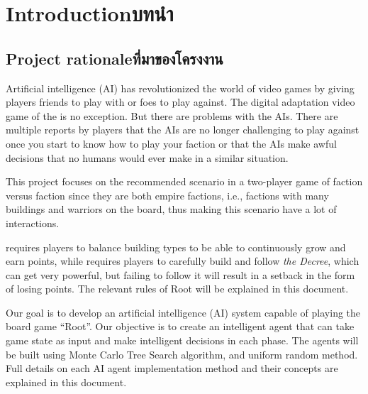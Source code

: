 \chapter{\ifenglish Introduction\else บทนำ\fi}

\section{\ifenglish Project rationale\else ที่มาของโครงงาน\fi}
Artificial intelligence (AI) has revolutionized the world of video games by giving players friends to play with or foes to play against. The digital adaptation video game of the \RootB{} is no exception. But there are problems with the AIs. There are multiple reports by \RootV{} players that the AIs are no longer challenging to play against once you start to know how to play your faction or that the AIs make awful decisions that no humans would ever make in a similar situation.

This project focuses on the recommended scenario in a two-player game of \Marquise{} faction versus \Eyrie{} faction since they are both empire factions, i.e., factions with many buildings and warriors on the board, thus making this scenario have a lot of interactions.

%
%
\Marquise{} requires players to balance building types to be able to continuously grow and earn points, while \Eyrie{} requires players to carefully build and follow \textit{the Decree}, which can get very powerful, but failing to follow it will result in a setback in the form of losing points. The relevant rules of Root will be explained in this document.
%

Our goal is to develop an artificial intelligence (AI) system capable of playing the board game ``Root''. Our objective is to create an intelligent agent that can take game state as input and make intelligent decisions in each phase. The agents will be built using Monte Carlo Tree Search algorithm, and uniform random method. Full details on each AI agent implementation method and their concepts are explained in this document.



